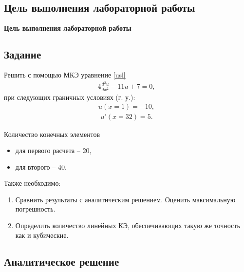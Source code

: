\subsection{Цель выполнения лабораторной работы}\label{blockN.VariantM}
\textbf{Цель выполнения лабораторной работы }-- \GoalOfResearch

\subsection{Задание}

Решить с помощью МКЭ уравнение \ref{usl}
\begin{align}\label{usl}
4\frac{d^2u}{dx^2}    -11   u  + 7 
=0,
\end{align}
при следующих граничных условиях (г. у.): 
\begin{align}\label{1_gu}
    u(x=1) = -10,
\end{align}
\begin{align}\label{2_gu}
    u'(x=32) = 5.
\end{align}

Количество конечных элементов
\begin{itemize}
    \item для первого расчета -- 20,
    \item для второго -- 40.
\end{itemize}

Также необходимо:
\begin{enumerate}
    \item Сравнить результаты с аналитическим решением. Оценить максимальную погрешность.
    \item Определить количество линейных КЭ, обеспечивающих такую же точность как и кубические.
\end{enumerate}

\newpage
\subsection{Аналитическое решение}

